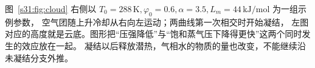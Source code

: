 \begin{xesolution}
\par\noindent\begin{minipage}{\linewidth}
\cloudFormationFigure
{}\label{s31:fig:cloud}
\end{minipage}\par\smallskip

图~\ref{s31:fig:cloud} 右侧以 $T_0=288\,\mathrm K,\varphi_0=0.6,\alpha=3.5,L_m=44\,\mathrm{kJ/mol}$ 为一组示例参数，
空气团随上升冷却从右向左运动；两曲线第一次相交时开始凝结，
左图对应的高度就是云底。图形把“压强降低”与“饱和蒸气压下降得更快”这两个同时发生的效应放在一起。
凝结以后释放潜热，气相水的物质的量也改变，不能继续沿未凝结分支外推。
\end{xesolution}
